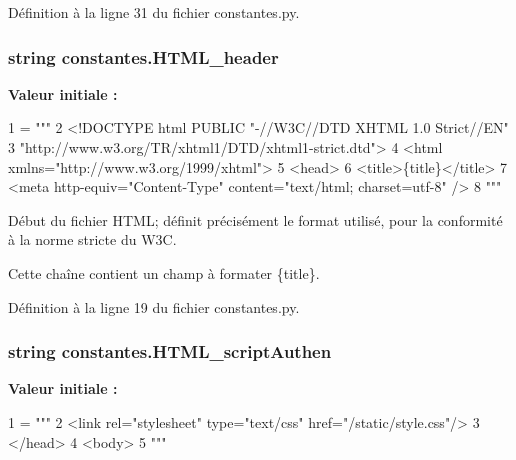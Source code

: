 Définition à la ligne 31 du fichier constantes.\-py.

\hypertarget{namespaceconstantes_a04524e30f424889c8a4407e02f93755f}{
\subsubsection[{H\-T\-M\-L\-\_\-header}]{\setlength{\rightskip}{0pt plus 5cm}string constantes.\-H\-T\-M\-L\-\_\-header}}\label{namespaceconstantes_a04524e30f424889c8a4407e02f93755f}
{\bfseries Valeur initiale \-:}
\begin{DoxyCode}
1 = \textcolor{stringliteral}{"""}
2 \textcolor{stringliteral}{<!DOCTYPE html PUBLIC "-//W3C//DTD XHTML 1.0 Strict//EN"}
3 \textcolor{stringliteral}{        "http://www.w3.org/TR/xhtml1/DTD/xhtml1-strict.dtd">}
4 \textcolor{stringliteral}{<html xmlns="http://www.w3.org/1999/xhtml">}
5 \textcolor{stringliteral}{<head>}
6 \textcolor{stringliteral}{<title>\{title\}</title>}
7 \textcolor{stringliteral}{<meta http-equiv="Content-Type" content="text/html; charset=utf-8" />}
8 \textcolor{stringliteral}{"""}
\end{DoxyCode}


Début du fichier H\-T\-M\-L; définit précisément le format utilisé, pour la conformité à la norme stricte du W3\-C. 

Cette chaîne contient un champ à formater \{title\}. 

Définition à la ligne 19 du fichier constantes.\-py.

\hypertarget{namespaceconstantes_a4bd1e6c18ef13d98f076c27d0e463532}{
\subsubsection[{H\-T\-M\-L\-\_\-script\-Authen}]{\setlength{\rightskip}{0pt plus 5cm}string constantes.\-H\-T\-M\-L\-\_\-script\-Authen}}\label{namespaceconstantes_a4bd1e6c18ef13d98f076c27d0e463532}
{\bfseries Valeur initiale \-:}
\begin{DoxyCode}
1 = \textcolor{stringliteral}{"""}
2 \textcolor{stringliteral}{<link rel="stylesheet" type="text/css" href="/static/style.css"/>}
3 \textcolor{stringliteral}{</head>}
4 \textcolor{stringliteral}{<body>}
5 \textcolor{stringliteral}{"""}
\end{DoxyCode}


